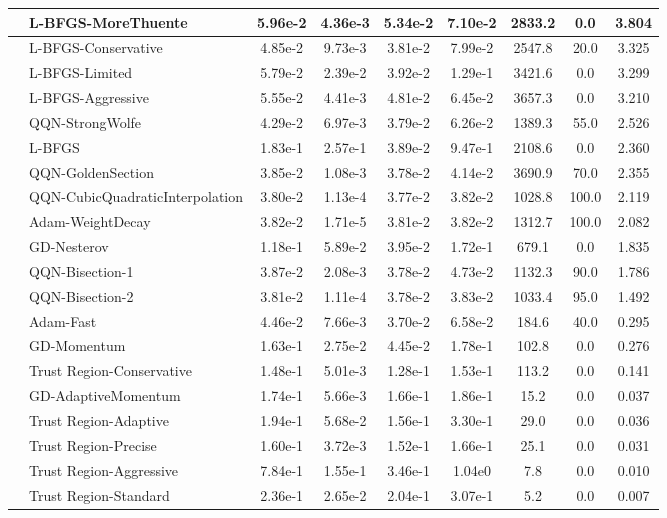 \documentclass[10pt]{article}
\begin{document}
\begin{longtable}{|l|l|c|c|c|c|c|c|c|}
\hline
 & L-BFGS-MoreThuente & 5.96e-2 & 4.36e-3 & 5.34e-2 & 7.10e-2 & 2833.2 & 0.0 & 3.804 \\
\hline
 & L-BFGS-Conservative & 4.85e-2 & 9.73e-3 & 3.81e-2 & 7.99e-2 & 2547.8 & 20.0 & 3.325 \\
\hline
 & L-BFGS-Limited & 5.79e-2 & 2.39e-2 & 3.92e-2 & 1.29e-1 & 3421.6 & 0.0 & 3.299 \\
\hline
 & L-BFGS-Aggressive & 5.55e-2 & 4.41e-3 & 4.81e-2 & 6.45e-2 & 3657.3 & 0.0 & 3.210 \\
\hline
 & QQN-StrongWolfe & 4.29e-2 & 6.97e-3 & 3.79e-2 & 6.26e-2 & 1389.3 & 55.0 & 2.526 \\
\hline
 & L-BFGS & 1.83e-1 & 2.57e-1 & 3.89e-2 & 9.47e-1 & 2108.6 & 0.0 & 2.360 \\
\hline
 & QQN-GoldenSection & 3.85e-2 & 1.08e-3 & 3.78e-2 & 4.14e-2 & 3690.9 & 70.0 & 2.355 \\
\hline
 & QQN-CubicQuadraticInterpolation & 3.80e-2 & 1.13e-4 & 3.77e-2 & 3.82e-2 & 1028.8 & 100.0 & 2.119 \\
\hline
 & Adam-WeightDecay & 3.82e-2 & 1.71e-5 & 3.81e-2 & 3.82e-2 & 1312.7 & 100.0 & 2.082 \\
\hline
 & GD-Nesterov & 1.18e-1 & 5.89e-2 & 3.95e-2 & 1.72e-1 & 679.1 & 0.0 & 1.835 \\
\hline
 & QQN-Bisection-1 & 3.87e-2 & 2.08e-3 & 3.78e-2 & 4.73e-2 & 1132.3 & 90.0 & 1.786 \\
\hline
 & QQN-Bisection-2 & 3.81e-2 & 1.11e-4 & 3.78e-2 & 3.83e-2 & 1033.4 & 95.0 & 1.492 \\
\hline
 & Adam-Fast & 4.46e-2 & 7.66e-3 & 3.70e-2 & 6.58e-2 & 184.6 & 40.0 & 0.295 \\
\hline
 & GD-Momentum & 1.63e-1 & 2.75e-2 & 4.45e-2 & 1.78e-1 & 102.8 & 0.0 & 0.276 \\
\hline
 & Trust Region-Conservative & 1.48e-1 & 5.01e-3 & 1.28e-1 & 1.53e-1 & 113.2 & 0.0 & 0.141 \\
\hline
 & GD-AdaptiveMomentum & 1.74e-1 & 5.66e-3 & 1.66e-1 & 1.86e-1 & 15.2 & 0.0 & 0.037 \\
\hline
 & Trust Region-Adaptive & 1.94e-1 & 5.68e-2 & 1.56e-1 & 3.30e-1 & 29.0 & 0.0 & 0.036 \\
\hline
 & Trust Region-Precise & 1.60e-1 & 3.72e-3 & 1.52e-1 & 1.66e-1 & 25.1 & 0.0 & 0.031 \\
\hline
 & Trust Region-Aggressive & 7.84e-1 & 1.55e-1 & 3.46e-1 & 1.04e0 & 7.8 & 0.0 & 0.010 \\
\hline
 & Trust Region-Standard & 2.36e-1 & 2.65e-2 & 2.04e-1 & 3.07e-1 & 5.2 & 0.0 & 0.007 \\

\end{longtable}
\end{document}

